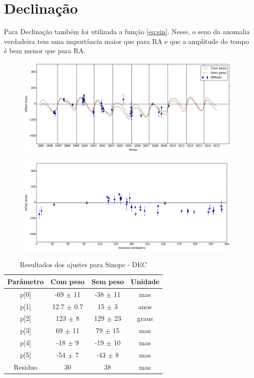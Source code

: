 \documentclass[11pt,a4paper]{report}
\begin{document}
\section*{Declinação}

\indent \indent Para Declinação também foi utilizada a função \ref{eq:sin}. Nesse, o seno da anomalia verdadeira tem uma importância maior que para RA e que a amplitude do tempo é bem menor que para RA.

\begin{figure}[h]
\includegraphics[scale=0.45]{Sinope/DEC.png} 
\end{figure}

\begin{figure}[h]
\includegraphics[scale=0.45]{Sinope/DEC_anom.png}  
\end{figure}

\begin{table}[h!]
\caption{\label{Tab: Sinope-DEC} Resultados dos ajustes para Sinope - DEC}
\begin{centering}
\begin{tabular}{cccc}
\hline
\hline
Parâmetro & Com peso & Sem peso & Unidade\tabularnewline
\hline
p[0] & -69 $\pm$ 11 & -38 $\pm$ 11 & mas\\
p[1] & 12.7 $\pm$ 0.7 & 15 $\pm$ 3 & anos\\
p[2] & 123 $\pm$ 8 & 129 $\pm$ 23 & graus\\
p[3] & 69 $\pm$ 11 & 79 $\pm$ 15 & mas\\
p[4] & -18 $\pm$ 9 & -19 $\pm$ 10 & mas\\
p[5] & -54 $\pm$ 7 & -43 $\pm$ 8 & mas\\
Residuo & 30 & 38 & mas\\
\hline 
\end{tabular} 
\par\end{centering}
\end{table}
\end{document}
